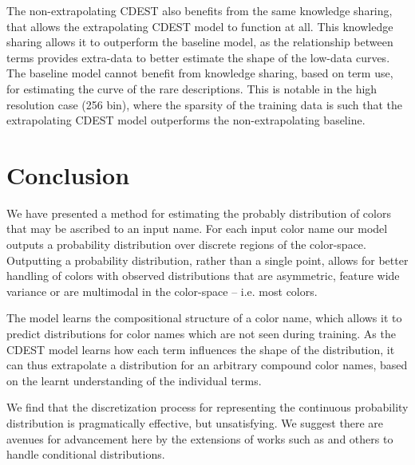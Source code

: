 \documentclass[11pt,a4paper]{article}
\newcommand{\textcite}{\citet}
\begin{document}
The non-extrapolating CDEST also benefits from the same knowledge sharing, that allows the extrapolating CDEST model to function at all.
This knowledge sharing allows it to outperform the baseline model, as the relationship between terms provides extra-data to better estimate the shape of the low-data curves.
The baseline model cannot benefit from knowledge sharing, based on term use, for estimating the curve of the rare descriptions.
This is notable in the high resolution case (256 bin),
where the sparsity of the training data is such that the extrapolating CDEST model outperforms the non-extrapolating baseline.




\section{Conclusion}\label{sec:conclusion}
We have presented a method for estimating the probably distribution of colors that may be ascribed to an input name.
For each input color name our model outputs a probability distribution over discrete regions of the color-space.
Outputting a probability distribution, rather than a single point, allows for better handling of colors with observed distributions that are asymmetric, feature wide variance or are multimodal in the color-space -- i.e. most colors.

The model learns the compositional structure of a color name, which allows it to predict distributions for color names which are not seen during training.
As the CDEST model learns how each term influences the shape of the distribution, it can thus extrapolate a distribution for
 an arbitrary compound color names, based on the learnt understanding of the individual terms.

We find that the discretization process for representing the continuous probability distribution is pragmatically effective, but unsatisfying.
We suggest there are avenues for advancement here by the extensions of works such as \textcite{1998NNpdfDiffCdf, likas2001probability, 2017arXivKernalMixtureNetworks} and others to handle conditional distributions.


\clearpage


\clearpage
\appendix


\end{document}
